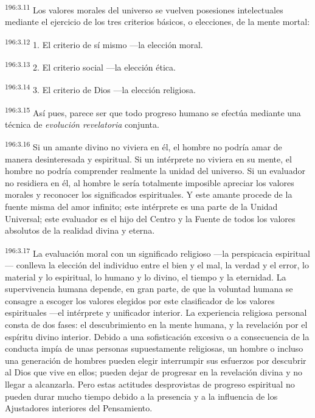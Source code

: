 \par 
\textsuperscript{196:3.11} Los valores morales del universo se vuelven posesiones intelectuales mediante el ejercicio de los tres criterios básicos, o elecciones, de la mente mortal:

\par 
\textsuperscript{196:3.12} 1. El criterio de sí mismo ---la elección moral.

\par 
\textsuperscript{196:3.13} 2. El criterio social ---la elección ética.

\par 
\textsuperscript{196:3.14} 3. El criterio de Dios ---la elección religiosa.

\par 
\textsuperscript{196:3.15} Así pues, parece ser que todo progreso humano se efectúa mediante una técnica de \textit{evolución revelatoria} conjunta.

\par 
\textsuperscript{196:3.16} Si un amante divino no viviera en él, el hombre no podría amar de manera desinteresada y espiritual. Si un intérprete no viviera en su mente, el hombre no podría comprender realmente la unidad del universo. Si un evaluador no residiera en él, al hombre le sería totalmente imposible apreciar los valores morales y reconocer los significados espirituales. Y este amante procede de la fuente misma del amor infinito; este intérprete es una parte de la Unidad Universal; este evaluador es el hijo del Centro y la Fuente de todos los valores absolutos de la realidad divina y eterna.

\par 
\textsuperscript{196:3.17} La evaluación moral con un significado religioso ---la perspicacia espiritual--- conlleva la elección del individuo entre el bien y el mal, la verdad y el error, lo material y lo espiritual, lo humano y lo divino, el tiempo y la eternidad. La supervivencia humana depende, en gran parte, de que la voluntad humana se consagre a escoger los valores elegidos por este clasificador de los valores espirituales ---el intérprete y unificador interior. La experiencia religiosa personal consta de dos fases: el descubrimiento en la mente humana, y la revelación por el espíritu divino interior. Debido a una sofisticación excesiva o a consecuencia de la conducta impía de unas personas supuestamente religiosas, un hombre o incluso una generación de hombres pueden elegir interrumpir sus esfuerzos por descubrir al Dios que vive en ellos; pueden dejar de progresar en la revelación divina y no llegar a alcanzarla. Pero estas actitudes desprovistas de progreso espiritual no pueden durar mucho tiempo debido a la presencia y a la influencia de los Ajustadores interiores del Pensamiento.


